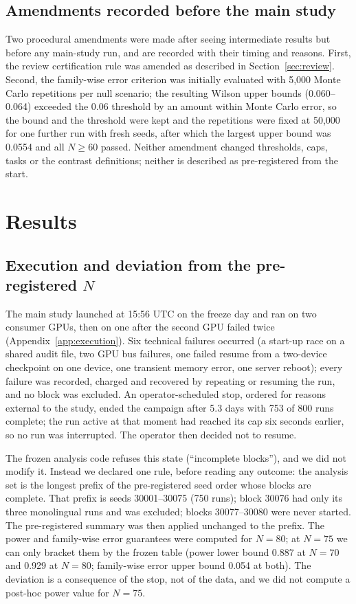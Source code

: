 \documentclass[preprint,12pt,authoryear]{elsarticle}
\begin{document}
\subsection{Amendments recorded before the main study}
\label{sec:amendments}

Two procedural amendments were made after seeing intermediate results but before any main-study run, and are recorded with their timing and reasons. First, the review certification rule was amended as described in Section~\ref{sec:review}. Second, the family-wise error criterion was initially evaluated with 5{,}000 Monte Carlo repetitions per null scenario; the resulting Wilson upper bounds (0.060--0.064) exceeded the 0.06 threshold by an amount within Monte Carlo error, so the bound and the threshold were kept and the repetitions were fixed at 50{,}000 for one further run with fresh seeds, after which the largest upper bound was 0.0554 and all $N\ge 60$ passed. Neither amendment changed thresholds, caps, tasks or the contrast definitions; neither is described as pre-registered from the start.

\section{Results}
\label{sec:results}

\subsection{Execution and deviation from the pre-registered $N$}
\label{sec:execution}

The main study launched at 15:56 UTC on the freeze day and ran on two consumer GPUs, then on one after the second GPU failed twice (Appendix~\ref{app:execution}). Six technical failures occurred (a start-up race on a shared audit file, two GPU bus failures, one failed resume from a two-device checkpoint on one device, one transient memory error, one server reboot); every failure was recorded, charged and recovered by repeating or resuming the run, and no block was excluded. An operator-scheduled stop, ordered for reasons external to the study, ended the campaign after 5.3 days with 753 of 800 runs complete; the run active at that moment had reached its cap six seconds earlier, so no run was interrupted. The operator then decided not to resume.

The frozen analysis code refuses this state (``incomplete blocks''), and we did not modify it. Instead we declared one rule, before reading any outcome: the analysis set is the longest prefix of the pre-registered seed order whose blocks are complete. That prefix is seeds 30001--30075 (750 runs); block 30076 had only its three monolingual runs and was excluded; blocks 30077--30080 were never started. The pre-registered summary was then applied unchanged to the prefix. The power and family-wise error guarantees were computed for $N{=}80$; at $N{=}75$ we can only bracket them by the frozen table (power lower bound 0.887 at $N{=}70$ and 0.929 at $N{=}80$; family-wise error upper bound 0.054 at both). The deviation is a consequence of the stop, not of the data, and we did not compute a post-hoc power value for $N{=}75$.
\end{document}
